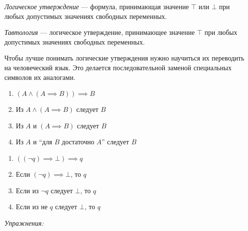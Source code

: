 {\it Логическое утверждение} --- формула, принимающая значение $\top$ или $\bot$
при любых допустимых значениях свободных переменных.

{\it Тавтология} --- логическое утверждение, принимающее значение $\top$ при
любых допустимых значениях свободных переменных.

Чтобы лучше понимать логические утверждения нужно научиться их переводить
на человеческий язык. Это делается последовательной заменой специальных
символов их аналогами.
\begin{fullwidth}
	\begin{multicols}{2}
		\begin{enumerate}
			\item{}$(A\land (A\implies B))\implies B$
			\item{}Из $A\land (A\implies B)$ следует $B$
			\item{}Из $A$ и $(A\implies B)$ следует $B$
			\item{}Из $A$ и ``для $B$ достаточно $A$'' следует $B$
		\end{enumerate}
		\begin{enumerate}
			\item{}$((\lnot q)\implies\bot)\implies q$
			\item{}Если $(\lnot q)\implies \bot$, то $q$
			\item{}Если из $\lnot q$ следует $\bot$, то $q$
			\item{}Если из не $q$ следует $\bot$, то $q$
		\end{enumerate}
	\end{multicols}
\end{fullwidth}

{\it Упражнения:}

